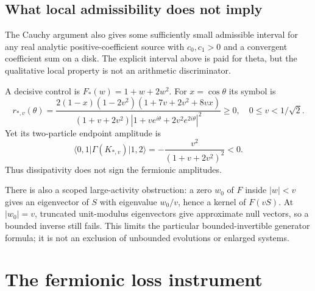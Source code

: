 \documentclass[11pt,letterpaper]{article}
\numberwithin{equation}{section}
\theoremstyle{remark}
\newcommand{\ket}[1]{\lvert #1\rangle}
\newcommand{\bra}[1]{\langle #1\rvert}
\begin{document}
\subsection{What local admissibility does not imply}
The Cauchy argument also gives some sufficiently small admissible
interval for any real analytic positive-coefficient source with
$c_0,c_1>0$ and a convergent coefficient sum on a disk. The explicit
interval above is paid for theta, but the qualitative local property
is not an arithmetic discriminator.

A decisive control is $F_*(w)=1+w+2w^2$. For $x=\cos\theta$ its symbol is
\begin{equation}
 r_{*,v}(\theta)=
 \frac{2(1-x)(1-2v^2)(1+7v+2v^2+8vx)}
 {(1+v+2v^2)|1+ve^{i\theta}+2v^2e^{2i\theta}|^2}\ge0,
 \quad 0\le v<1/\sqrt2. \label{eq:controlsymbol}
\end{equation}
Yet its two-particle endpoint amplitude is
\begin{equation}
 \bra{0,1}\Gamma(K_{*,v})\ket{1,2}
 =-\frac{v^2}{(1+v+2v^2)^2}<0. \label{eq:negativecontrol}
\end{equation}
Thus dissipativity does not sign the fermionic amplitudes.

There is also a scoped large-activity obstruction: a zero $w_0$ of $F$
inside $|w|<v$ gives an eigenvector of $S$ with eigenvalue $w_0/v$, hence
a kernel of $F(vS)$. At $|w_0|=v$, truncated unit-modulus eigenvectors
give approximate null vectors, so a bounded inverse still fails.
This limits the particular bounded-invertible generator formula; it
is not an exclusion of unbounded evolutions or enlarged systems.

\section{The fermionic loss instrument}
\label{sec:instrument}
\end{document}

